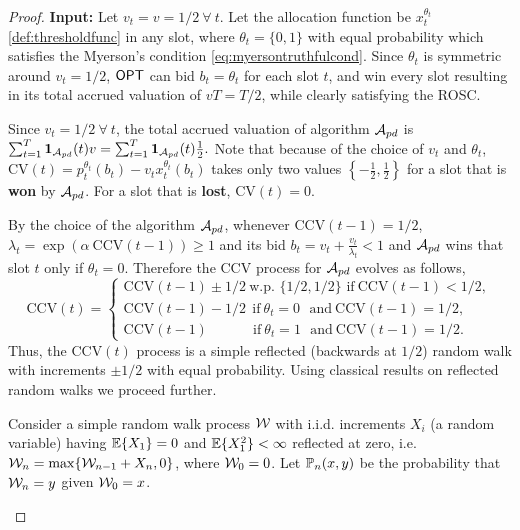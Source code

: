 \begin{proof}
{\bf Input:} Let $v_t=v=1/2 \ \forall \ t$. Let the allocation function be $x_t^{\theta_t}$ \eqref{def:thresholdfunc} in any slot, where $\theta_t = \{0,1\}$ with equal probability which satisfies the Myerson's condition \eqref{eq:myersontruthfulcond}. Since $\theta_t$ is symmetric around $v_t=1/2$,  $\mathsf{OPT}$ can bid $b_t=\theta_t$ for each slot $t$, and win every slot resulting in its total accrued valuation of $vT = T/2$, while clearly satisfying  the ROSC. 





Since $v_t=1/2 \ \forall \ t$, the  total accrued valuation of algorithm $\mathcal{A}_{pd}$ is 
$\sum_{t=1}^T \b1_{\cA_{pd}}(t) v = \sum_{t=1}^T \b1_{\cA_{pd}}(t) \frac{1}{2}.$
Note that because of the choice of $v_t$ and $\theta_t$, $\text{CV}(t) = p_t^{\theta_t}(b_t) - v_t x_t^{\theta_t}(b_t)$ takes only two values $\left\{-\frac{1}{2}, \frac{1}{2}\right\}$ 
for a slot that is {\bf won} by $\mathcal{A}_{pd}$. For a slot that is {\bf lost}, $\text{CV}(t)=0$.

By the choice of the algorithm $\mathcal{A}_{pd}$, whenever $\text{CCV}(t-1) = 1/2$, $\lambda_t= \exp\left(\alpha \ \text{CCV}(t-1)\right)\ge 1$ and its bid $b_t = v_t + \frac{v_t}{\lambda_t}< 1$ and $\mathcal{A}_{pd}$ wins that slot $t$ only if $\theta_t=0$.
Therefore the CCV process for $\mathcal{A}_{pd}$ evolves as follows, 
\begin{equation}\label{defn:CCVprocessFeng}
\text{CCV}(t)=\begin{cases}\text{CCV}(t-1) \pm 1/2 \   \text{w.p. $\{1/2, 1/2\}$ if} \  
\text{CCV}(t-1) < 1/2, \\
\text{CCV}(t-1) -1/2 \ \ \text{if}\ \theta_t=0 \ \ \ \text{and} \
\text{CCV}(t-1) =1/2,
\\
\text{CCV}(t-1)\ \quad \quad \quad \text{if}\ \theta_t=1\ \ \   \text{and} \  
\text{CCV}(t-1) = 1/2. \end{cases}
\end{equation}
Thus, the $\text{CCV}(t)$ process is a simple reflected (backwards at $1/2$) random walk with increments $\pm 1/2$ with equal probability. Using classical results on reflected random walks we proceed further.

\begin{definition}\label{defn:randomwalk}\cite{port1965}
Consider a simple random walk process $\mathcal{W}$ with i.i.d. increments  $X_i$ (a random variable) having ${\mathbb{E}}\{X_1\}=0$ and ${\mathbb{E}}\{X_1^2\}<\infty$  reflected at zero, i.e. $\mathcal{W}_n = \max\{\mathcal{W}_{n-1}+X_n,0\}$, where 
$\mathcal{W}_0=0$.
 Let ${\mathbb{P}}_n(x,y)$ be the probability that $\mathcal{W}_n=y$ given $\mathcal{W}_0=x$.
\end{definition}


\end{proof}
